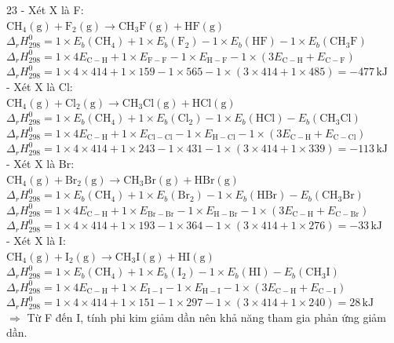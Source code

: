 \begin{loigiaibth}{23}
  - Xét X là F: \\ $\mathrm {CH_4(g) + F_2(g) \longrightarrow CH_3F(g) + HF(g)}$ \\ $\Delta _rH_{298}^0 = 1 \times E_b (\mathrm {CH_4}) + 1 \times E_b (\mathrm {F_2}) - 1 \times E_b (\mathrm {HF}) - 1 \times E_b (\mathrm {CH_3F})$ \\ $\Delta _rH_{298}^0 = 1 \times 4E_{\mathrm {C-H}} + 1 \times E_{\mathrm {F-F}} - 1 \times E_{\mathrm {H-F}} - 1 \times (3E_{\mathrm {C-H}} + E_{\mathrm {C-F}})$ \\ $\Delta _rH_{298}^0 = 1 \times 4 \times 414 + 1 \times 159 - 1 \times 565 - 1 \times (3 \times 414 + 1 \times 485) = -477\,\mathrm {kJ}$ \\ - Xét X là Cl: \\ $\mathrm {CH_4(g) + Cl_2(g) \longrightarrow CH_3Cl(g) + HCl(g)}$ \\ $\Delta _rH_{298}^0 = 1 \times E_b (\mathrm {CH_4}) + 1 \times E_b (\mathrm {Cl_2}) - 1 \times E_b (\mathrm {HCl}) - E_b (\mathrm {CH_3Cl})$ \\ $\Delta _rH_{298}^0 = 1 \times 4E_{\mathrm {C-H}} + 1 \times E_{\mathrm {Cl-Cl}} - 1 \times E_{\mathrm {H-Cl}} - 1 \times (3E_{\mathrm {C-H}} + E_{\mathrm {C-Cl}})$ \\ $\Delta _rH_{298}^0 = 1 \times 4 \times 414 + 1 \times 243 - 1 \times 431 - 1 \times (3 \times 414 + 1 \times 339) = -113\,\mathrm {kJ}$ \\ - Xét X là Br: \\ $\mathrm {CH_4(g) + Br_2(g) \longrightarrow CH_3Br(g) + HBr(g)}$ \\ $\Delta _rH_{298}^0 = 1 \times E_b (\mathrm {CH_4}) + 1 \times E_b (\mathrm {Br_2}) - 1 \times E_b (\mathrm {HBr}) - E_b (\mathrm {CH_3Br})$ \\ $\Delta _rH_{298}^0 = 1 \times 4E_{\mathrm {C-H}} + 1 \times E_{\mathrm {Br-Br}} - 1 \times E_{\mathrm {H-Br}} - 1 \times (3E_{\mathrm {C-H}} + E_{\mathrm {C-Br}})$ \\ $\Delta _rH_{298}^0 = 1 \times 4 \times 414 + 1 \times 193 - 1 \times 364 - 1 \times (3 \times 414 + 1 \times 276) = -33\,\mathrm {kJ}$ \\ - Xét X là I: \\ $\mathrm {CH_4(g) + I_2(g) \longrightarrow CH_3I(g) + HI(g)}$ \\ $\Delta _rH_{298}^0 = 1 \times E_b (\mathrm {CH_4}) + 1 \times E_b (\mathrm {I_2}) - 1 \times E_b (\mathrm {HI}) - E_b (\mathrm {CH_3I})$ \\ $\Delta _rH_{298}^0 = 1 \times 4E_{\mathrm {C-H}} + 1 \times E_{\mathrm {I-I}} - 1 \times E_{\mathrm {H-I}} - 1 \times (3E_{\mathrm {C-H}} + E_{\mathrm {C-I}})$ \\ $\Delta _rH_{298}^0 = 1 \times 4 \times 414 + 1 \times 151 - 1 \times 297 - 1 \times (3 \times 414 + 1 \times 240) = 28\,\mathrm {kJ}$ \\ $\Rightarrow $ Từ F đến I, tính phi kim giảm dần nên khả năng tham gia phản ứng giảm dần.
\end{loigiaibth}
